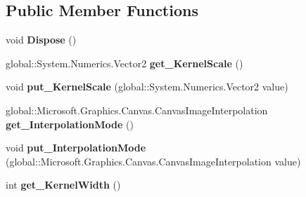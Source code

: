 \subsection*{Public Member Functions}
\begin{DoxyCompactItemize}
\item 
\mbox{\label{class_microsoft_1_1_graphics_1_1_canvas_1_1_effects_1_1_convolve_matrix_effect_ade7c5a61826ba4eb1335c485b77bb198}} 
void {\bfseries Dispose} ()
\item 
\mbox{\label{class_microsoft_1_1_graphics_1_1_canvas_1_1_effects_1_1_convolve_matrix_effect_a6d9159be1d73df73a313b7b99727f4e7}} 
global\+::\+System.\+Numerics.\+Vector2 {\bfseries get\+\_\+\+Kernel\+Scale} ()
\item 
\mbox{\label{class_microsoft_1_1_graphics_1_1_canvas_1_1_effects_1_1_convolve_matrix_effect_a6fec289269f130b154319296dc96911f}} 
void {\bfseries put\+\_\+\+Kernel\+Scale} (global\+::\+System.\+Numerics.\+Vector2 value)
\item 
\mbox{\label{class_microsoft_1_1_graphics_1_1_canvas_1_1_effects_1_1_convolve_matrix_effect_af57f00feab944bdafee4121511d98b7b}} 
global\+::\+Microsoft.\+Graphics.\+Canvas.\+Canvas\+Image\+Interpolation {\bfseries get\+\_\+\+Interpolation\+Mode} ()
\item 
\mbox{\label{class_microsoft_1_1_graphics_1_1_canvas_1_1_effects_1_1_convolve_matrix_effect_ab3f459077b5255ccba8d35422d144883}} 
void {\bfseries put\+\_\+\+Interpolation\+Mode} (global\+::\+Microsoft.\+Graphics.\+Canvas.\+Canvas\+Image\+Interpolation value)
\item 
\mbox{\label{class_microsoft_1_1_graphics_1_1_canvas_1_1_effects_1_1_convolve_matrix_effect_ada3a96275c0f8088afc7741a987edae5}} 
int {\bfseries get\+\_\+\+Kernel\+Width} ()
\item 

\end{DoxyCompactItemize}

